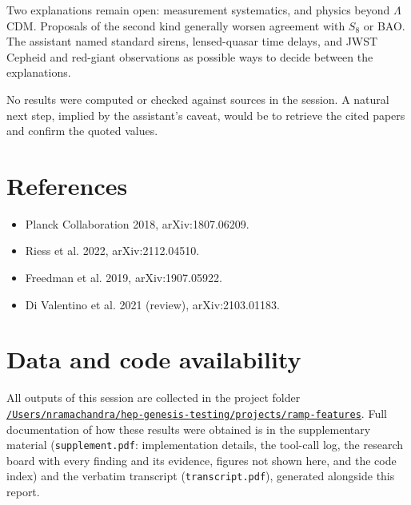 \documentclass[11pt,a4paper]{article}
\begin{document}
Two explanations remain open: measurement systematics, and physics beyond $\Lambda$CDM. Proposals of the second kind generally worsen agreement with $S_8$ or BAO. The assistant named standard sirens, lensed-quasar time delays, and JWST Cepheid and red-giant observations as possible ways to decide between the explanations.

No results were computed or checked against sources in the session. A natural next step, implied by the assistant's caveat, would be to retrieve the cited papers and confirm the quoted values.

\section*{References}
\begin{itemize}
\item Planck Collaboration 2018, arXiv:1807.06209.
\item Riess et al. 2022, arXiv:2112.04510.
\item Freedman et al. 2019, arXiv:1907.05922.
\item Di Valentino et al. 2021 (review), arXiv:2103.01183.
\end{itemize}

\section*{Data and code availability}
All outputs of this session are collected in the project folder \href{file:///Users/nramachandra/hep-genesis-testing/projects/ramp-features}{\texttt{/\allowbreak{}Users/\allowbreak{}nramachandra/\allowbreak{}hep-genesis-testing/\allowbreak{}projects/\allowbreak{}ramp-features}}.
Full documentation of how these results were obtained is in the supplementary material (\texttt{supplement.pdf}: implementation details, the tool-call log, the research board with every finding and its evidence, figures not shown here, and the code index) and the verbatim transcript (\texttt{transcript.pdf}), generated alongside this report.
\end{document}
